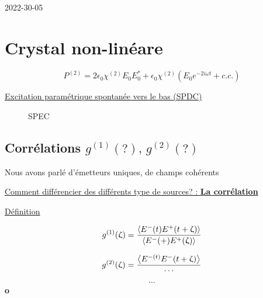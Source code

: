 


2022-30-05

\section*{Crystal non-linéare}

$$P^{(2)} = 2 \epsilon_0 \chi^{(2)} E_0 E_0^{*} + \epsilon_0 \chi^{(2)} \left( E_0 e^{-2i\omega t} + c.c. \right) $$ 


\underline{Excitation paramétrique spontanée vers le bas (SPDC)} 

\begin{figure}[ht]
    \centering
    \caption{SPEC}
    \label{fig:spdc}
\end{figure}

\setcounter{section}{3}
\setcounter{subsection}{4}

\subsection{Corrélations $g^{(1)} (?),\, g^{(2)}(?)$}

Nous avons parlé d'émetteurs uniques, de champs cohérents

\underline{Comment différencier des différents type de sources? : \textbf{La corrélation}} 

\underline{Définition} 

$$g^{(1)}(\upzeta) = \frac{\expval{E^{-}(t) E^{+}(t+\upzeta)}}{\expval{E^-(+)E^{+}(\upzeta)}} $$ 

$$g^{(2)}(\upzeta) = \frac{\expval{E^{-(t)}E^{-}(t + \upzeta)}}{\dotsb} $$ 


$$\dotsb$$ 
\textbf{o}



